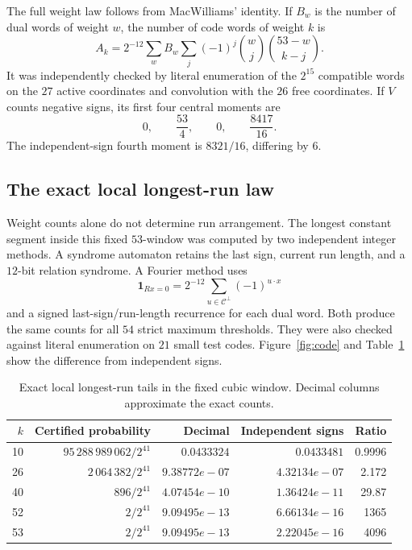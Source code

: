 \documentclass[11pt]{article}
\theoremstyle{definition}\newtheorem{definition}[theorem]{Definition}
\begin{document}
The full weight law follows from MacWilliams' identity. If $B_w$
is the number of dual words of weight $w$, the number of code
words of weight $k$ is
\begin{equation}\label{eq:macwilliams}
 A_k=2^{-12}\sum_w B_w
       \sum_j(-1)^j\binom wj\binom{53-w}{k-j}.
\end{equation}
It was independently checked by literal enumeration of the
$2^{15}$ compatible words on the $27$ active coordinates and
convolution with the $26$ free coordinates. If $V$ counts negative
signs, its first four central moments are
\[
 0,\qquad \frac{53}{4},\qquad0,\qquad\frac{8417}{16}.
\]
The independent-sign fourth moment is $8321/16$, differing by $6$.

\subsection{The exact local longest-run law}
Weight counts alone do not determine run arrangement. The longest
constant segment inside this fixed $53$-window was computed by two
independent integer methods. A syndrome automaton retains the last
sign, current run length, and a $12$-bit relation syndrome. A Fourier
method uses
\[
 \mathbf1_{Rx=0}=2^{-12}\sum_{u\in\mathcal C^\perp}(-1)^{u\cdot x}
\]
and a signed last-sign/run-length recurrence for each dual word.
Both produce the same counts for all $54$ strict maximum thresholds.
They were also checked against literal enumeration on $21$ small
test codes. Figure~\ref{fig:code} and Table~\ref{tab:localtail} show
the difference from independent signs.
\begin{table}[htbp]\centering\small\setlength{\tabcolsep}{4pt}
\caption{Exact local longest-run tails in the fixed cubic window. Decimal columns approximate the exact counts.}\label{tab:localtail}
\begin{tabular}{rrrrr}
\toprule
$k$ & Certified probability & Decimal & Independent signs & Ratio \\
\midrule
10 & $95\,288\,989\,062/2^{41}$ & $0.0433324$ & $0.0433481$ & 0.9996 \\
26 & $2\,064\,382/2^{41}$ & $9.38772e-07$ & $4.32134e-07$ & 2.172 \\
40 & $896/2^{41}$ & $4.07454e-10$ & $1.36424e-11$ & 29.87 \\
52 & $2/2^{41}$ & $9.09495e-13$ & $6.66134e-16$ & 1365 \\
53 & $2/2^{41}$ & $9.09495e-13$ & $2.22045e-16$ & 4096 \\
\bottomrule\end{tabular}\end{table}
\end{document}
